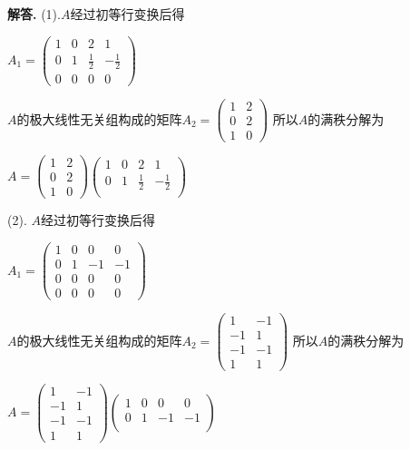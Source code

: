 \documentclass[12pt, a4paper, oneside]{ctexart}
\newcounter{problemname}
\newenvironment{solution}{\par\noindent\textbf{解答. }}{\par}
\newenvironment{note}{\par\noindent\textbf{题目\arabic{problemname}的注记. }}{\par}
\begin{document}
\begin{solution}
    (1).$A$经过初等行变换后得

    $A_1=
    \begin{pmatrix}
        1 & 0 & 2 & 1 \\
        0 & 1 & \frac{1}{2} & -\frac{1}{2} \\
        0 & 0 & 0 & 0    
    \end{pmatrix}
    $

    $A$的极大线性无关组构成的矩阵$A_2=    
    \begin{pmatrix}
        1 & 2 \\
        0 & 2  \\
        1 & 0    
    \end{pmatrix}
    $
    所以$A$的满秩分解为

    $A=
    \begin{pmatrix}
        1 & 2 \\
        0 & 2  \\
        1 & 0    
    \end{pmatrix}
    \begin{pmatrix}
        1 & 0 & 2 & 1 \\
        0 & 1 & \frac{1}{2} & -\frac{1}{2} \\ 
    \end{pmatrix}
    $

    (2).
    $A$经过初等行变换后得

    $A_1=
    \begin{pmatrix}
        1 & 0 & 0 & 0 \\
        0 & 1 & -1 & -1 \\
        0 & 0 & 0 & 0 \\ 
        0 & 0 & 0 & 0   
    \end{pmatrix}
    $

    $A$的极大线性无关组构成的矩阵$A_2=    
    \begin{pmatrix}
        1 & -1 \\
        -1 & 1  \\
        -1 & -1  \\
        1 & 1  
    \end{pmatrix}
    $
    所以$A$的满秩分解为

    $A=
    \begin{pmatrix}
        1 & -1 \\
        -1 & 1  \\
        -1 & -1  \\
        1 & 1  
    \end{pmatrix}
    \begin{pmatrix}
        1 & 0 & 0 & 0 \\
        0 & 1 & -1 & -1 \\
    \end{pmatrix}
    $

\end{solution}
\end{document}
